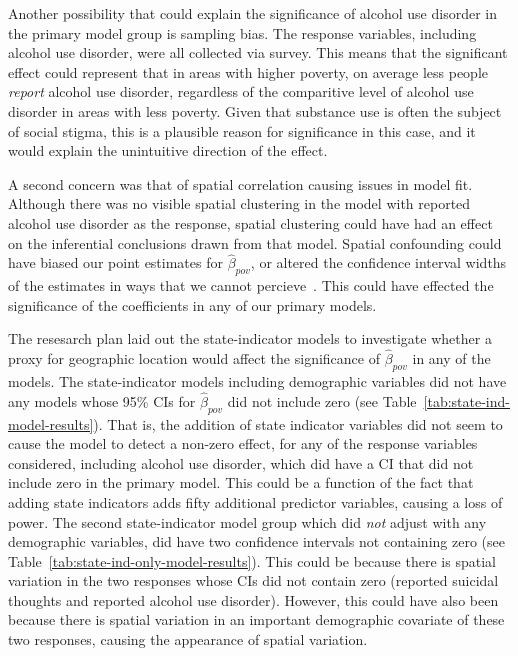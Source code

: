 \documentclass{article}
\begin{document}
Another possibility that could explain the significance
of alcohol use disorder in the primary model group
is sampling bias.
The response variables, including alcohol use disorder,
were all collected via survey.
This means that the significant effect could represent
that in areas with higher poverty,
on average less people \textit{report} alcohol
use disorder,
regardless of the comparitive level of alcohol use disorder
in areas with less poverty.
Given that substance use is often the subject of social stigma,
this is a plausible reason for significance in this case,
and it would explain the unintuitive direction of the effect.

A second concern was that of spatial correlation
causing issues in model fit.
Although there was no visible spatial clustering in
the model with reported alcohol use disorder as the response,
spatial clustering could have had an effect
on the inferential conclusions drawn from that model.
Spatial confounding could have biased
our point estimates for $\hat{\beta}_{pov}$,
or altered the confidence interval widths of the estimates
in ways that we cannot percieve~\cite{hodges_2010}.
This could have effected the significance of the coefficients in
any of our primary models.

The resesarch plan laid out the state-indicator
models to investigate whether a proxy for geographic
location would affect the significance of
$\hat{\beta}_{pov}$
in any of the models.
The state-indicator models including demographic variables
did not have any models whose 95\% CIs for
$\hat{\beta}_{pov}$
did not include zero
(see Table~\ref{tab:state-ind-model-results}).
That is, the addition of state indicator variables did
not seem to cause the model to detect a non-zero effect,
for any of the response variables considered,
including alcohol use disorder, which did have a
CI that did not include zero in the primary model.
This could be a function of the fact that adding
state indicators adds fifty additional predictor
variables, causing a loss of power.
The second state-indicator model group
which did \textit{not} adjust with any demographic variables,
did have two confidence intervals not containing zero
(see Table~\ref{tab:state-ind-only-model-results}).
This could be because there is spatial variation
in the two responses whose CIs did not contain zero
(reported suicidal thoughts and reported alcohol use disorder).
However, this could have also been because there is
spatial variation in an important demographic covariate of
these two responses, causing the appearance of spatial variation.
\end{document}
